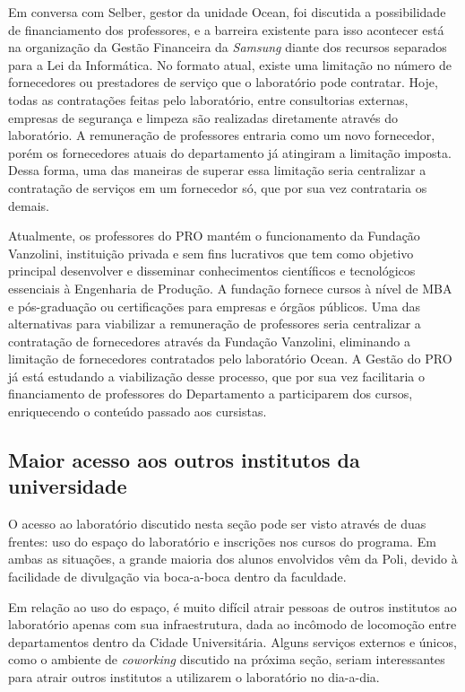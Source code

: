 Em conversa com Selber, gestor da unidade Ocean, foi discutida a possibilidade de financiamento dos professores, e a barreira existente para isso acontecer está na organização da Gestão Financeira da \textit{Samsung} diante dos recursos separados para a Lei da Informática. No formato atual, existe uma limitação no número de fornecedores ou prestadores de serviço que o laboratório pode contratar. Hoje, todas as contratações feitas pelo laboratório, entre consultorias externas, empresas de segurança e limpeza são realizadas diretamente através do laboratório. A remuneração de professores entraria como um novo fornecedor, porém os fornecedores atuais do departamento já atingiram a limitação imposta. Dessa forma, uma das maneiras de superar essa limitação seria centralizar a contratação de serviços em um fornecedor só, que por sua vez contrataria os demais.

Atualmente, os professores do PRO mantém o funcionamento da Fundação Vanzolini, instituição privada e sem fins lucrativos que tem como objetivo principal desenvolver e disseminar conhecimentos científicos e tecnológicos essenciais à Engenharia de Produção. A fundação fornece cursos à nível de MBA e pós-graduação ou certificações para empresas e órgãos públicos. Uma das alternativas para viabilizar a remuneração de professores seria centralizar a contratação de fornecedores através da Fundação Vanzolini, eliminando a limitação de fornecedores contratados pelo laboratório Ocean. A Gestão do PRO já está estudando a viabilização desse processo, que por sua vez facilitaria o financiamento de professores do Departamento a participarem dos cursos, enriquecendo o conteúdo passado aos cursistas.

\subsection{Maior acesso aos outros institutos da universidade}

O acesso ao laboratório discutido nesta seção pode ser visto através de duas frentes: uso do espaço do laboratório e inscrições nos cursos do programa. Em ambas as situações, a grande maioria dos alunos envolvidos vêm da Poli, devido à facilidade de divulgação via boca-a-boca dentro da faculdade.

Em relação ao uso do espaço, é muito difícil atrair pessoas de outros institutos ao laboratório apenas com sua infraestrutura, dada ao incômodo de locomoção entre departamentos dentro da Cidade Universitária. Alguns serviços externos e únicos, como o ambiente de \textit{coworking} discutido na próxima seção, seriam interessantes para atrair outros institutos a utilizarem o laboratório no dia-a-dia.


